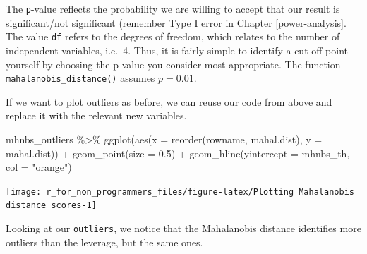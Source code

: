 \documentclass[
]{book}
\newenvironment{Shaded}{\begin{snugshade}}{\end{snugshade}}
\newcommand{\AttributeTok}[1]{\textcolor[rgb]{0.77,0.63,0.00}{#1}}
\newcommand{\FloatTok}[1]{\textcolor[rgb]{0.00,0.00,0.81}{#1}}
\newcommand{\FunctionTok}[1]{\textcolor[rgb]{0.00,0.00,0.00}{#1}}
\newcommand{\NormalTok}[1]{#1}
\newcommand{\SpecialCharTok}[1]{\textcolor[rgb]{0.00,0.00,0.00}{#1}}
\newcommand{\StringTok}[1]{\textcolor[rgb]{0.31,0.60,0.02}{#1}}
\begin{document}
The \texttt{p}-value reflects the probability we are willing to accept that our result is significant/not significant (remember Type I error in Chapter \ref{power-analysis}. The value \texttt{df} refers to the degrees of freedom, which relates to the number of independent variables, i.e.~4. Thus, it is fairly simple to identify a cut-off point yourself by choosing the p-value you consider most appropriate. The function \texttt{mahalanobis\_distance()} assumes \(p = 0.01\).

If we want to plot outliers as before, we can reuse our code from above and replace it with the relevant new variables.

\begin{Shaded}
\begin{Highlighting}[]
\NormalTok{mhnbs\_outliers }\SpecialCharTok{\%\textgreater{}\%}
  \FunctionTok{ggplot}\NormalTok{(}\FunctionTok{aes}\NormalTok{(}\AttributeTok{x =} \FunctionTok{reorder}\NormalTok{(rowname, mahal.dist),}
             \AttributeTok{y =}\NormalTok{ mahal.dist)) }\SpecialCharTok{+}
  \FunctionTok{geom\_point}\NormalTok{(}\AttributeTok{size =} \FloatTok{0.5}\NormalTok{) }\SpecialCharTok{+}
  \FunctionTok{geom\_hline}\NormalTok{(}\AttributeTok{yintercept =}\NormalTok{ mhnbs\_th, }\AttributeTok{col =} \StringTok{"orange"}\NormalTok{)}
\end{Highlighting}
\end{Shaded}

\begin{center}\texttt{[image: r\_for\_non\_programmers\_files/figure-latex/Plotting Mahalanobis distance scores-1]} \end{center}

Looking at our \texttt{outliers}, we notice that the Mahalanobis distance identifies more outliers than the leverage, but the same ones.
\end{document}
